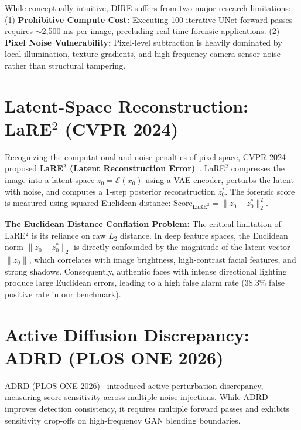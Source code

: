 \documentclass[12pt,a4paper]{report}
\begin{document}
While conceptually intuitive, DIRE suffers from two major research limitations: (1) \textbf{Prohibitive Compute Cost:} Executing 100 iterative UNet forward passes requires $\sim$2,500 ms per image, precluding real-time forensic applications. (2) \textbf{Pixel Noise Vulnerability:} Pixel-level subtraction is heavily dominated by local illumination, texture gradients, and high-frequency camera sensor noise rather than structural tampering.

\section{Latent-Space Reconstruction: LaRE$^2$ (CVPR 2024)}
Recognizing the computational and noise penalties of pixel space, CVPR 2024 proposed \textbf{LaRE$^2$ (Latent Reconstruction Error)}~\cite{chen2024lare}. LaRE$^2$ compresses the image into a latent space $z_0 = \mathcal{E}(x_0)$ using a VAE encoder, perturbs the latent with noise, and computes a 1-step posterior reconstruction $z^*_0$. The forensic score is measured using squared Euclidean distance: $\text{Score}_{\text{LaRE}^2} = \|z_0 - z^*_0\|_2^2$.

\noindent\textbf{The Euclidean Distance Conflation Problem:} The critical limitation of LaRE$^2$ is its reliance on raw $L_2$ distance. In deep feature spaces, the Euclidean norm $\|z_0 - z^*_0\|_2$ is directly confounded by the magnitude of the latent vector $\|z_0\|$, which correlates with image brightness, high-contrast facial features, and strong shadows. Consequently, authentic faces with intense directional lighting produce large Euclidean errors, leading to a high false alarm rate (38.3\% false positive rate in our benchmark).

\section{Active Diffusion Discrepancy: ADRD (PLOS ONE 2026)}
ADRD (PLOS ONE 2026)~\cite{liu2026adrd} introduced active perturbation discrepancy, measuring score sensitivity across multiple noise injections. While ADRD improves detection consistency, it requires multiple forward passes and exhibits sensitivity drop-offs on high-frequency GAN blending boundaries.
\end{document}
